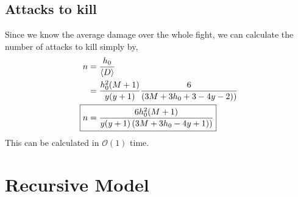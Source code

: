 
			\subsection{Attacks to kill}
				Since we know the average damage over the whole fight, we can calculate the number of attacks to kill simply by,
				\begin{align}
					n &= \frac{h_0}{\langle D \rangle} \\
					&= \frac{h^2_0(M+1)}{y(y+1)}\frac{6}{\left(3M+3h_0+3-4y-2) \right)} \\
					\Aboxed{n &= \frac{6h^2_0(M+1)}{y(y+1)\left(3M+3h_0-4y+1) \right)}}
				\end{align}
				This can be calculated in $\mathcal{O}(1)$ time.

		\section{Recursive Model}\label{sec:average_damage}
